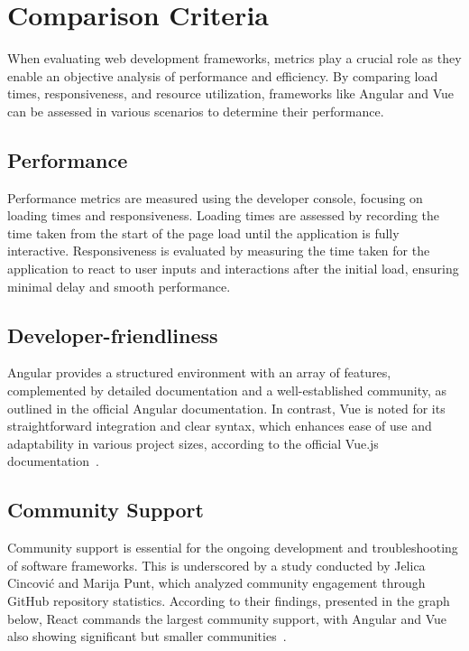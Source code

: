 \section {Comparison Criteria}

When evaluating web development frameworks, metrics play a crucial role as they enable an objective analysis of performance and efficiency. By comparing load times, responsiveness, and resource utilization, frameworks like Angular and Vue can be assessed in various scenarios to determine their performance.

\subsection{Performance}
Performance metrics are measured using the developer console, focusing on loading times and responsiveness. Loading times are assessed by recording the time taken from the start of the page load until the application is fully interactive. Responsiveness is evaluated by measuring the time taken for the application to react to user inputs and interactions after the initial load, ensuring minimal delay and smooth performance.
\subsection{Developer-friendliness}
Angular provides a structured environment with an array of features, complemented by detailed documentation and a well-established community, as outlined in the official Angular documentation. In contrast, Vue is noted for its straightforward integration and clear syntax, which enhances ease of use and adaptability in various project sizes, according to the official Vue.js documentation~\cite{angular, vue}.

\subsection{Community Support}
Community support is essential for the ongoing development and troubleshooting of software frameworks. This is underscored by a study conducted by Jelica Cincović and Marija Punt, which analyzed community engagement through GitHub repository statistics. According to their findings, presented in the graph below, React commands the largest community support, with Angular and Vue also showing significant but smaller communities~\cite{cincovic2020comparison}.

